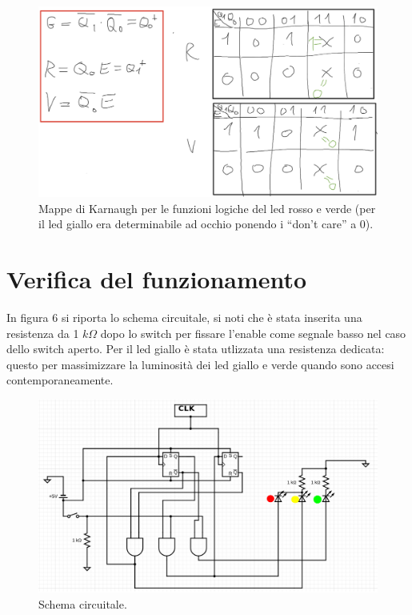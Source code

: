 \documentclass[10pt,a4paper]{article}
\begin{document}
\begin{figure}
    \begin{center}
    \includegraphics[scale=0.25]{fig5.png}
    \caption{Mappe di Karnaugh per le funzioni logiche del led rosso e verde (per il led giallo era determinabile ad occhio ponendo i “don’t care” a 0).}
    \label{fig5}
    \end{center}
\end{figure}

\section{Verifica del funzionamento}
In figura 6 si riporta lo schema circuitale, si noti che è stata inserita una resistenza da 1 $k\Omega$ dopo lo switch per fissare l'enable come segnale basso nel caso dello switch aperto. Per il led giallo è stata utlizzata una resistenza dedicata: questo per massimizzare la luminosità dei led giallo e verde quando sono accesi contemporaneamente.

\begin{figure}
    \begin{center}
    \includegraphics[scale=0.25]{fig6.png}
    \caption{Schema circuitale.}
    \label{fig6}
    \end{center}
\end{figure}
\end{document}
